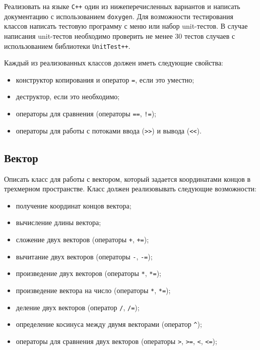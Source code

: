 \documentclass[a4paper,12pt]{article}
\begin{document}
Реализовать на языке \verb|С++| один из нижеперечисленных вариантов и
написать документацию с использованием \verb|doxygen|. Для возможности
тестирования классов написать тестовую программу с меню или набор
unit-тестов. В случае написания unit-тестов необходимо проверить не
менее 30 тестов случаев с использованием библиотеки \verb|UnitTest++|.

Каждый из реализованных классов должен иметь следующие свойства:

\begin{itemize}
\item конструктор копирования и оператор \lstinline|=|, если это
  уместно;
\item деструктор, если это необходимо;
\item операторы для сравнения (операторы \lstinline|==|,
  \lstinline|!=|);
\item операторы для работы с потоками ввода (\lstinline|>>|) и вывода
  (\lstinline|<<|).
\end{itemize}

\subsection{Вектор}

Описать класс для работы с вектором, который задается координатами
концов в трехмерном пространстве.  Класс должен реализовывать
следующие возможности:

\begin{itemize}
\item получение координат концов вектора;
\item вычисление длины вектора;
\item сложение двух векторов (операторы \lstinline|+|,
  \lstinline|+=|);
\item вычитание двух векторов (операторы \lstinline|-|,
  \lstinline|-=|);
\item произведение двух векторов (операторы \lstinline|*|,
  \lstinline|*=|);
\item произведение вектора на число (операторы \lstinline|*|,
  \lstinline|*=|);
\item деление двух векторов (оператор \lstinline|/|, \lstinline|/=|);
\item определение косинуса между двумя векторами (оператор
  \lstinline|^|);
\item операторы для сравнения двух векторов (операторы \lstinline|>|,
  \lstinline|>=|, \lstinline|<|, \lstinline|<=|);
\end{itemize}
\end{document}

